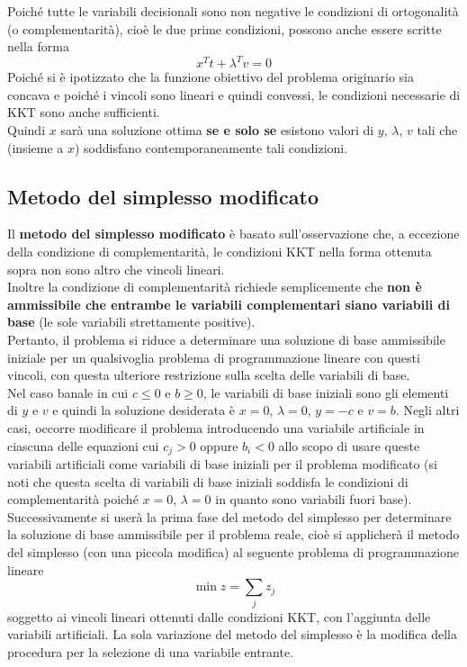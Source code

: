 \documentclass[a4paper]{extarticle}
\begin{document}
Poiché tutte le variabili decisionali sono non negative le condizioni di ortogonalità (o complementarità), cioè le due prime condizioni, possono anche essere scritte nella forma
\[x^T t + \lambda^T v = 0\]
Poiché si è ipotizzato che la funzione obiettivo del problema originario sia concava e poiché i vincoli sono lineari e quindi convessi, le condizioni necessarie di KKT sono anche sufficienti.\\
Quindi $x$ sarà una soluzione ottima \textbf{se e solo se} esistono valori di $y$, $\lambda$, $v$ tali che (insieme a $x$) soddisfano contemporaneamente tali condizioni.

\vspace{1em}
\subsection{Metodo del simplesso modificato}
Il \textbf{metodo del simplesso modificato} è basato sull'osservazione che, a eccezione della condizione di complementarità, le condizioni KKT nella forma ottenuta sopra non sono altro che vincoli lineari.\\
Inoltre la condizione di complementarità richiede semplicemente che \textbf{non è ammissibile che entrambe le variabili complementari siano variabili di base} (le sole variabili strettamente positive).\\
Pertanto, il problema si riduce a determinare una soluzione di base ammissibile iniziale per un qualsivoglia problema di programmazione lineare con questi vincoli, con questa ulteriore restrizione sulla scelta delle variabili di base.\\
Nel caso banale in cui $c \leq 0$ e $b \geq 0$, le variabili di base iniziali sono gli elementi di $y$ e $v$ e quindi la soluzione desiderata è $x = 0$, $\lambda = 0$, $y = -c$ e $v = b$.
Negli altri casi, occorre modificare il problema introducendo una variabile artificiale in ciascuna delle equazioni cui $c_j > 0$ oppure $b_i < 0$ allo scopo di usare queste variabili artificiali come variabili di base iniziali per il problema modificato (si noti che questa scelta di variabili di base iniziali soddisfa le condizioni di complementarità poiché $x = 0$, $\lambda = 0$ in quanto sono variabili fuori base).\\
Successivamente si userà la prima fase del metodo del simplesso per determinare la soluzione di base ammissibile per il problema reale, cioè si applicherà il metodo del simplesso (con una piccola modifica) al seguente problema di programmazione lineare
\[\min z = \sum_j z_j\]
soggetto ai vincoli lineari ottenuti dalle condizioni KKT, con l'aggiunta delle variabili artificiali. La sola variazione del metodo del simplesso è la modifica della procedura per la selezione di una variabile entrante.
\end{document}
